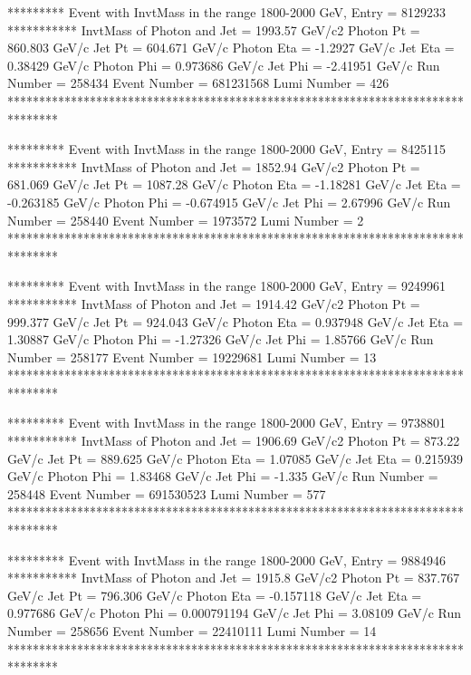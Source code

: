                                                                      
********* Event with InvtMass in the range 1800-2000 GeV, Entry = 8129233 ***********
InvtMass of Photon and Jet = 1993.57 GeV/c2
Photon Pt = 860.803 GeV/c
Jet Pt = 604.671 GeV/c
Photon Eta = -1.2927 GeV/c
Jet Eta = 0.38429 GeV/c
Photon Phi = 0.973686 GeV/c
Jet Phi = -2.41951 GeV/c
Run Number = 258434
Event Number = 681231568
Lumi Number = 426
********************************************************************************
                                                                     
                                                                     
********* Event with InvtMass in the range 1800-2000 GeV, Entry = 8425115 ***********
InvtMass of Photon and Jet = 1852.94 GeV/c2
Photon Pt = 681.069 GeV/c
Jet Pt = 1087.28 GeV/c
Photon Eta = -1.18281 GeV/c
Jet Eta = -0.263185 GeV/c
Photon Phi = -0.674915 GeV/c
Jet Phi = 2.67996 GeV/c
Run Number = 258440
Event Number = 1973572
Lumi Number = 2
********************************************************************************
                                                                     
                                                                     
********* Event with InvtMass in the range 1800-2000 GeV, Entry = 9249961 ***********
InvtMass of Photon and Jet = 1914.42 GeV/c2
Photon Pt = 999.377 GeV/c
Jet Pt = 924.043 GeV/c
Photon Eta = 0.937948 GeV/c
Jet Eta = 1.30887 GeV/c
Photon Phi = -1.27326 GeV/c
Jet Phi = 1.85766 GeV/c
Run Number = 258177
Event Number = 19229681
Lumi Number = 13
********************************************************************************
                                                                     
                                                                     
********* Event with InvtMass in the range 1800-2000 GeV, Entry = 9738801 ***********
InvtMass of Photon and Jet = 1906.69 GeV/c2
Photon Pt = 873.22 GeV/c
Jet Pt = 889.625 GeV/c
Photon Eta = 1.07085 GeV/c
Jet Eta = 0.215939 GeV/c
Photon Phi = 1.83468 GeV/c
Jet Phi = -1.335 GeV/c
Run Number = 258448
Event Number = 691530523
Lumi Number = 577
********************************************************************************
                                                                     
                                                                     
********* Event with InvtMass in the range 1800-2000 GeV, Entry = 9884946 ***********
InvtMass of Photon and Jet = 1915.8 GeV/c2
Photon Pt = 837.767 GeV/c
Jet Pt = 796.306 GeV/c
Photon Eta = -0.157118 GeV/c
Jet Eta = 0.977686 GeV/c
Photon Phi = 0.000791194 GeV/c
Jet Phi = 3.08109 GeV/c
Run Number = 258656
Event Number = 22410111
Lumi Number = 14
********************************************************************************
                                                                     
